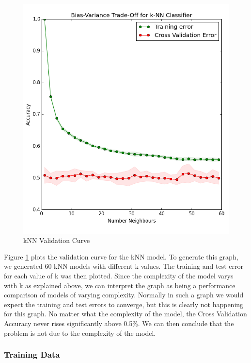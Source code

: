 \documentclass{report}
\begin{document}
\begin{figure}[H]
	\caption{kNN Validation Curve}
	\centerline{\includegraphics[scale=0.5]{vis/prices-bias-variance.png}}
	\label{fig:knn-validation}
\end{figure}

Figure \ref{fig:knn-validation} plots the validation curve for the kNN model. To generate this graph, we generated 60 kNN models with different k values. The training and test error for each value of k was then plotted. Since the complexity of the model varys with k as explained above, we can interpret the graph as being a performance comparison of models of varying complexity. Normally in such a graph we would expect the training and test errors to converge, but this is clearly not happening for this graph. No matter what the complexity of the model, the Cross Validation Accuracy never rises significantly above 0.5\%. We can then conclude that the problem is not due to the complexity of the model.

\subsubsection{Training Data}
\end{document}
